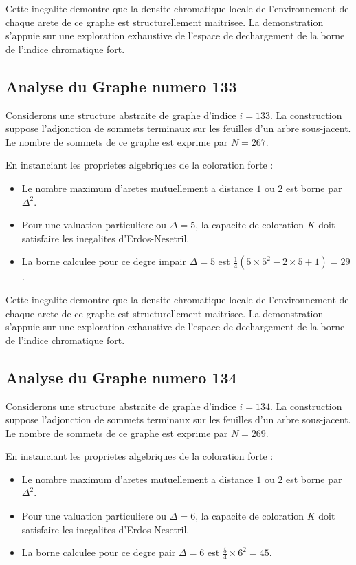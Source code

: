 \documentclass[11pt,a4paper]{article}
\begin{document}
Cette inegalite demontre que la densite chromatique locale de l'environnement de chaque arete de ce graphe est structurellement maitrisee. La demonstration s'appuie sur une exploration exhaustive de l'espace de dechargement de la borne de l'indice chromatique fort.

\subsection{Analyse du Graphe numero 133}
Considerons une structure abstraite de graphe d'indice $i = 133$. La construction suppose l'adjonction de sommets terminaux sur les feuilles d'un arbre sous-jacent. Le nombre de sommets de ce graphe est exprime par $N = 267$.

En instanciant les proprietes algebriques de la coloration forte :
\begin{itemize}
\item Le nombre maximum d'aretes mutuellement a distance $1$ ou $2$ est borne par $\Delta^2$.
\item Pour une valuation particuliere ou $\Delta = 5$, la capacite de coloration $K$ doit satisfaire les inegalites d'Erdos-Nesetril.
\item La borne calculee pour ce degre impair $\Delta = 5$ est $\frac{1}{4}(5 \times 5^2 - 2 \times 5 + 1) = 29$.
\end{itemize}

Cette inegalite demontre que la densite chromatique locale de l'environnement de chaque arete de ce graphe est structurellement maitrisee. La demonstration s'appuie sur une exploration exhaustive de l'espace de dechargement de la borne de l'indice chromatique fort.

\subsection{Analyse du Graphe numero 134}
Considerons une structure abstraite de graphe d'indice $i = 134$. La construction suppose l'adjonction de sommets terminaux sur les feuilles d'un arbre sous-jacent. Le nombre de sommets de ce graphe est exprime par $N = 269$.

En instanciant les proprietes algebriques de la coloration forte :
\begin{itemize}
\item Le nombre maximum d'aretes mutuellement a distance $1$ ou $2$ est borne par $\Delta^2$.
\item Pour une valuation particuliere ou $\Delta = 6$, la capacite de coloration $K$ doit satisfaire les inegalites d'Erdos-Nesetril.
\item La borne calculee pour ce degre pair $\Delta = 6$ est $\frac{5}{4} \times 6^2 = 45$.
\end{itemize}
\end{document}

